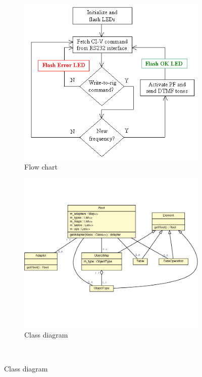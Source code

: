 \begin{figure}
\centering
\begin{subfigure}{.5\textwidth}
  \includegraphics[width=.95\linewidth]{../images/code-visualisations/flow-chart.png}
  \caption{Flow chart}
  \label{fig:flow-chart}
\end{subfigure}%
\begin{subfigure}{.5\textwidth}
  \includegraphics[width=.95\linewidth]{../images/code-visualisations/class-diagram.png}
  \caption{Class diagram}
  \label{fig:class-diagram}
\end{subfigure}\\

\end{figure}
